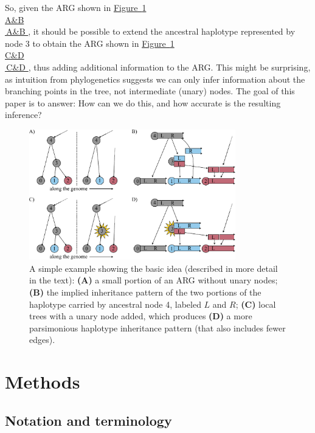 \documentclass[10pt,twoside,lineno]{gsajnl}
\newcommand*{\figref}[2][]{%
	\hyperref[{#2}]{%
		Figure~\ref*{#2}%
		\ifx\\#1\\%
		\else
		\,#1%
		\fi
	}%
}
\begin{document}
So, given the ARG shown in \figref[A\&B]{fig:conceptual},
it should be possible to extend the ancestral haplotype represented by node 3
to obtain the ARG shown in \figref[C\&D]{fig:conceptual},
thus adding additional information to the ARG.
This might be surprising,
as intuition from phylogenetics suggests we can only infer
information about the branching points in the tree, not intermediate (unary) nodes.
The goal of this paper is to answer:
How can we do this, and how accurate is the resulting inference?

\begin{figure}
    \begin{center}
    \includegraphics[width=0.8\textwidth]{figures/conceptual_figure.pdf}
    \end{center}
    \caption{
        A simple example showing the basic idea
        (described in more detail in the text):
        \textbf{(A)} a small portion of an ARG without unary nodes;
        \textbf{(B)} the implied inheritance pattern of the two portions of the haplotype carried by ancestral node 4,
        labeled $L$ and $R$;
        \textbf{(C)} local trees with a unary node added,
        which produces \textbf{(D)} a more parsimonious haplotype inheritance pattern
        (that also includes fewer edges).
        \label{fig:conceptual}
    }
\end{figure}

\section{Methods}

\subsection{Notation and terminology}
\end{document}
